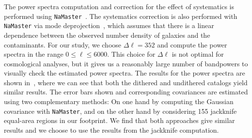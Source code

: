 \documentclass[a4paper,fleqn,usenatbib]{mnras}
\begin{document}
The power spectra computation and correction for the effect of systematics is performed using \texttt{NaMaster}~\citep{2019MNRAS.484.4127A}. The systematics correction is also performed with \texttt{NaMaster} via mode deprojection~\citep{2016MNRAS.456.2095E,2019MNRAS.484.4127A}, which assumes that there is a linear dependence between the observed number density of galaxies and the contaminants. For our study, we choose $\Delta \ell = 352$ and compute the power spectra in the range $0 \leq \ell \leq 6000$. This choice for $\Delta\ell$ is not optimal for cosmological analyses, but it gives us a reasonably large number of bandpowers to visually check the estimated power spectra. The results for the power spectra are shown in~, where we can see that both the dithered and undithered catalogs yield similar results. The error bars shown and corresponding covariances are estimated using two complementary methods: On one hand by computing the Gaussian covariance with \texttt{NaMaster}, and on the other hand by considering 155 jackknife equal-area regions in our footprint. We find that both approaches give similar results and we choose to use the results from the jackknife computation.
\end{document}
